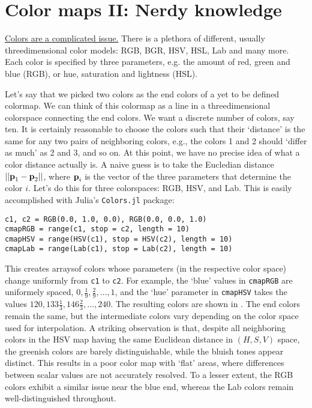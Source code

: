 \section{Color maps II: Nerdy knowledge}
\href{https://xkcd.com/1882/}{Colors are a complicated issue.} There is a plethora of different, usually threedimensional color models: RGB, BGR, HSV, HSL, Lab and many more. Each color is specified by three parameters, e.g. the amount of red, green and blue (RGB), or hue, saturation and lightness (HSL).   

Let's say that we picked two colors as the end colors of a yet to be defined colormap. We can think of this colormap as a line in a threedimensional colorspace connecting the end colors. We want a discrete number of colors, say ten. It is certainly reasonable to choose the colors such that their `distance' is the same for any two pairs of neighboring colors, e.g., the colors 1 and 2 should `differ as much' as 2 and 3, and so on. At this point, we have no precise idea of what a color distance actually is. A naive guess is to take the Eucledian distance $||\textbf{p}_1-\textbf{p}_2||$, where $\textbf{p}_i$ is the vector of the three parameters that determine the color $i$.  Let's do this for three colorspaces: RGB, HSV, and Lab. This is easily accomplished with Julia's \verb|Colors.jl| package:

\begin{listing}[h]
\begin{verbatim} 
c1, c2 = RGB(0.0, 1.0, 0.0), RGB(0.0, 0.0, 1.0)
cmapRGB = range(c1, stop = c2, length = 10) 
cmapHSV = range(HSV(c1), stop = HSV(c2), length = 10) 
cmapLab = range(Lab(c1), stop = Lab(c2), length = 10) 
\end{verbatim}
\end{listing}

This creates arraysof colors whose parameters (in the respective color space) change uniformly from \verb|c1| to \verb|c2|. For example, the `blue' values in \verb|cmapRGB| are uniformely spaced, $0,\frac{1}{9},\frac{2}{9},\ldots,1$, and the `hue' parameter in \verb|cmapHSV| takes the values $120,133\frac{1}{3},146\frac{2}{3},\ldots,240$.
The resulting colors are shown in . 
The end colors remain the same, but the intermediate colors vary depending on the color space used for interpolation. A striking observation is that, despite all neighboring colors in the HSV map having the same Euclidean distance in $(H, S, V)$ space, the greenish colors are barely distinguishable, while the bluish tones appear distinct. This results in a poor color map with `flat' areas, where differences between scalar values are not accurately resolved. To a lesser extent, the RGB colors exhibit a similar issue near the blue end, whereas the Lab colors remain well-distinguished throughout.

